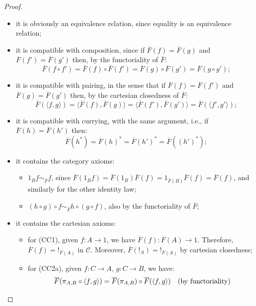 \begin{proof}
    \begin{itemize}
        \item it is obviously an equivalence relation, since equality is an equivalence relation;
        \item it is compatible with composition, since if $\overline F(f) = \overline F(g)$ and $\overline F(f') = \overline F(g')$ then, by the functoriality of $\overline F$:
        \[ \overline F(f \circ f') = \overline F(f) \circ \overline F(f') = \overline F(g) \circ \overline F(g') = \overline F(g \circ g');\]
        \item it is compatible with pairing, in the sense that if $\overline F(f) = \overline F(f')$ and $\overline F(g) = \overline F(g')$ then, by the cartesian closedness of $\overline F$:
        \[ \overline F(\langle f, g \rangle) = \langle \overline F(f), \overline F(g)\rangle = \langle \overline F(f'), \overline F(g')\rangle = \overline F(\langle f',g'\rangle);\]
        \item it is compatible with currying, with the same argument, i.e., if $\overline F(h) = \overline F(h')$ then:
        \[ \overline F(h^*) = \overline F(h)^* = \overline F(h')^* = \overline F((h')^*);\]
        \item it contains the category axioms:
        \begin{itemize}[label=$\ast$]
            \item $1_Bf \sim_{\overline F} f$, since $\overline F(1_Bf) = \overline F(1_B)\overline F(f) = 1_{\overline F(B)}\overline F(f) = \overline F(f)$, and similarly for the other identity law;
            \item $(h \circ g) \circ f \sim_{\overline F} h \circ (g \circ f)$, also by the functoriality of $\overline F$;
        \end{itemize}
        \item it contains the cartesian axioms:
        \begin{itemize}[label=$\ast$]
            \item for (CC1), given $f : A \to 1$, we have $\overline F(f) : \overline F(A) \to 1$. Therefore, $\overline F(f) = !_{\overline F(A)}$ in $\mathcal C$. Moreover, $\overline F(!_A) = !_{\overline F(A)}$ by cartesian closedness;
            \item for (CC2a), given $f : C \to A$, $g : C \to B$, we have:
            \begin{align*}
                \overline F(\pi_{A,B} \circ \langle f, g \rangle) &= \overline F(\pi_{A,B}) \circ \overline F(\langle f, g \rangle) &&(\textnormal{by functoriality}) \\

\end{align*}
\end{itemize}
\end{itemize}
\end{proof}
